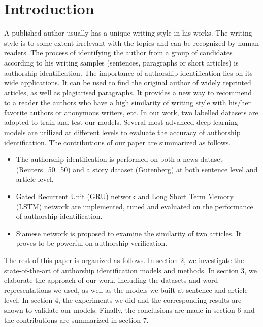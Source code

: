 \documentclass{article} %
\begin{document}
\section{Introduction}
A published author usually has a unique writing style in his works. The writing style is to some extent irrelevant with the topics and can be recognized by human readers. The process of identifying the author from a group of candidates according to his writing samples (sentences,  paragraphs or short articles) is authorship identification.
The importance of authorship identification lies on its wide applications. It can be used to find the original author of widely reprinted articles, as well as plagiarised paragraphs. It provides a new way to recommend to a reader the authors who have a high similarity of writing style with his/her favorite authors or anonymous writers, etc.
In our work, two labelled datasets are adopted to train and test our models. Several most advanced deep learning models are utilized at different levels to evaluate the accuracy of authorship identification.
The contributions of our paper are summarized as follows.
\begin{itemize}
    \item The authorship identification is performed on both a news dataset (Reuters\_50\_50) and a story dataset (Gutenberg) at both sentence level and article level.
    \item Gated Recurrent Unit (GRU) network and Long Short Term Memory (LSTM) network are implemented, tuned and evaluated on the performance of authorship identification.
    \item Siamese network is proposed to examine the similarity of two articles. It proves to be powerful on authorship verification.
\end{itemize}
The rest of this paper is organized as follows. In section 2, we investigate the state-of-the-art of authorship identification models and methods. In section 3, we elaborate the approach of our work, including the datasets and word representations we used, as well as the models we built at sentence and article level. In section 4, the experiments we did and the corresponding results are shown to validate our models. Finally, the conclusions are made in section 6 and the contributions are summarized in section 7.
\end{document}
